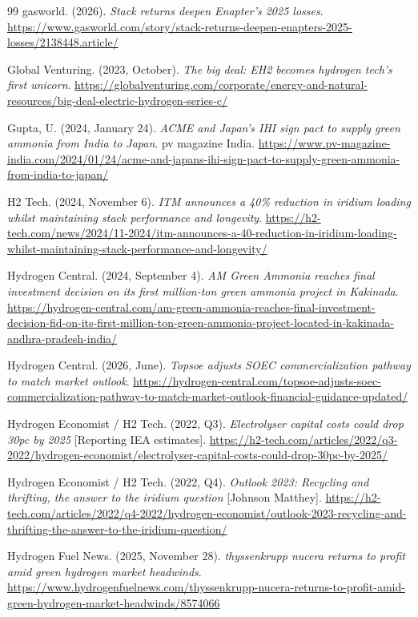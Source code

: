 {\begin{thebibliography}{99}
 gasworld. (2026). \emph{Stack returns deepen Enapter's 2025 losses}. \url{https://www.gasworld.com/story/stack-returns-deepen-enapters-2025-losses/2138448.article/}

 Global Venturing. (2023, October). \emph{The big deal: EH2 becomes hydrogen tech's first unicorn}. \url{https://globalventuring.com/corporate/energy-and-natural-resources/big-deal-electric-hydrogen-series-c/}

 Gupta, U. (2024, January 24). \emph{ACME and Japan's IHI sign pact to supply green ammonia from India to Japan}. pv magazine India. \url{https://www.pv-magazine-india.com/2024/01/24/acme-and-japans-ihi-sign-pact-to-supply-green-ammonia-from-india-to-japan/}

 H2 Tech. (2024, November 6). \emph{ITM announces a 40\% reduction in iridium loading whilst maintaining stack performance and longevity}. \url{https://h2-tech.com/news/2024/11-2024/itm-announces-a-40-reduction-in-iridium-loading-whilst-maintaining-stack-performance-and-longevity/}

 Hydrogen Central. (2024, September 4). \emph{AM Green Ammonia reaches final investment decision on its first million-ton green ammonia project in Kakinada}. \url{https://hydrogen-central.com/am-green-ammonia-reaches-final-investment-decision-fid-on-its-first-million-ton-green-ammonia-project-located-in-kakinada-andhra-pradesh-india/}

 Hydrogen Central. (2026, June). \emph{Topsoe adjusts SOEC commercialization pathway to match market outlook}. \url{https://hydrogen-central.com/topsoe-adjusts-soec-commercialization-pathway-to-match-market-outlook-financial-guidance-updated/}

 Hydrogen Economist / H2 Tech. (2022, Q3). \emph{Electrolyser capital costs could drop 30pc by 2025} [Reporting IEA estimates]. \url{https://h2-tech.com/articles/2022/q3-2022/hydrogen-economist/electrolyser-capital-costs-could-drop-30pc-by-2025/}

 Hydrogen Economist / H2 Tech. (2022, Q4). \emph{Outlook 2023: Recycling and thrifting, the answer to the iridium question} [Johnson Matthey]. \url{https://h2-tech.com/articles/2022/q4-2022/hydrogen-economist/outlook-2023-recycling-and-thrifting-the-answer-to-the-iridium-question/}

 Hydrogen Fuel News. (2025, November 28). \emph{thyssenkrupp nucera returns to profit amid green hydrogen market headwinds}. \url{https://www.hydrogenfuelnews.com/thyssenkrupp-nucera-returns-to-profit-amid-green-hydrogen-market-headwinds/8574066}


\end{thebibliography}}
